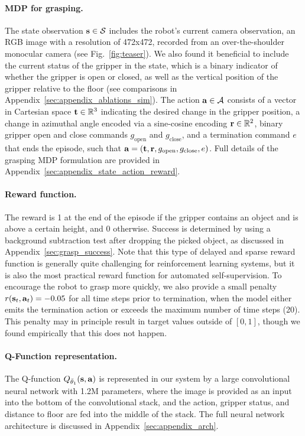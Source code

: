 \documentclass{article}
\newcommand{\modelparams}{{1.2M}} %
\begin{document}
\vspace{-0.1in}
\paragraph{MDP for grasping.} The state observation $\mathbf{s} \in \mathcal{S}$ includes the robot's current camera observation, an RGB image with a resolution of 472x472, recorded from an over-the-shoulder monocular camera (see Fig.~\ref{fig:teaser}).
We also found it beneficial to include the current status of the gripper in the state, which is a binary indicator of whether the gripper is open or closed, as well as the vertical position of the gripper relative to the floor (see comparisons in Appendix~\ref{sec:appendix_ablations_sim}). The action $\mathbf{a} \in \mathcal{A}$ consists of a vector in Cartesian space $\mathbf{t} \in \mathbb{R}^3$ indicating the desired change in the gripper position, a change in azimuthal angle encoded via a sine-cosine encoding $\mathbf{r} \in \mathbb{R}^2$, binary gripper open and close commands $g_\text{open}$ and $g_\text{close}$, and a termination command $e$ that ends the episode, such that ${\mathbf{a} = (\mathbf{t}, \mathbf{r}, g_\text{open}, g_\text{close}, e)}$. Full details of the grasping MDP formulation are provided in Appendix~\ref{sec:appendix_state_action_reward}.

\vspace{-0.1in}
\paragraph{Reward function.}
The reward is 1 at the end of the episode if the gripper contains an object and is above a certain height, and 0 otherwise. Success is determined by using a background subtraction test after dropping the picked object, as discussed in Appendix~\ref{sec:grasp_success}. Note that this type of delayed and sparse reward function is generally quite challenging for reinforcement learning systems,
but it is also the most practical reward function for automated self-supervision. To encourage the robot to grasp more quickly, we also provide a small penalty $r(\mathbf{s}_t,\mathbf{a}_t) = -0.05$ for all time steps prior to termination, when the model either emits the termination action or exceeds the maximum number of time steps (20). This penalty may in principle result in target values outside of $[0,1]$, though we found empirically that this does not happen.


\vspace{-0.1in}
\paragraph{Q-Function representation.} The Q-function $Q_{\bar{\theta}_1}(\mathbf{s},\mathbf{a})$ is represented in our system by a large convolutional neural network with \modelparams{} parameters, where the image is provided as an input into the bottom of the convolutional stack, and the action, gripper status, and distance to floor are fed into the middle of the stack. The full neural network architecture is discussed in Appendix~\ref{sec:appendix_arch}.
\end{document}
